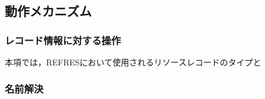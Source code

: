 \subsection{動作メカニズム}
\subsubsection{レコード情報に対する操作}
本項では，REFRESにおいて使用されるリソースレコードのタイプと

\subsubsection{名前解決}
